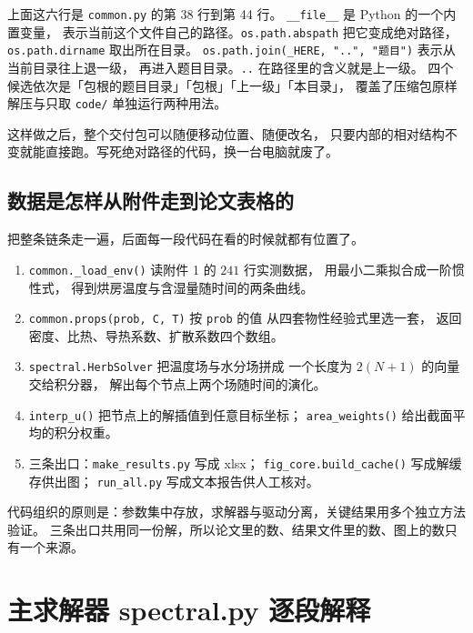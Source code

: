 上面这六行是 \texttt{common.py} 的第 38 行到第 44 行。
\texttt{\_\_file\_\_} 是 Python 的一个内置变量，
表示当前这个文件自己的路径。\texttt{os.path.abspath} 把它变成绝对路径，
\texttt{os.path.dirname} 取出所在目录。
\texttt{os.path.join(\_HERE, "..", "题目")} 表示从当前目录往上退一级，
再进入题目目录。\texttt{..} 在路径里的含义就是上一级。
四个候选依次是「包根的题目目录」「包根」「上一级」「本目录」，
覆盖了压缩包原样解压与只取 \texttt{code/} 单独运行两种用法。

这样做之后，整个交付包可以随便移动位置、随便改名，
只要内部的相对结构不变就能直接跑。写死绝对路径的代码，换一台电脑就废了。

\subsection{数据是怎样从附件走到论文表格的}

把整条链条走一遍，后面每一段代码在看的时候就都有位置了。

\begin{enumerate}[leftmargin=1.8em,itemsep=2pt]
\item \texttt{common.\_load\_env()} 读附件 1 的 $241$ 行实测数据，
  用最小二乘拟合成一阶惯性式，
  得到烘房温度与含湿量随时间的两条曲线。
\item \texttt{common.props(prob, C, T)} 按 \texttt{prob} 的值
  从四套物性经验式里选一套，
  返回密度、比热、导热系数、扩散系数四个数组。
\item \texttt{spectral.HerbSolver} 把温度场与水分场拼成
  一个长度为 $2(N+1)$ 的向量交给积分器，
  解出每个节点上两个场随时间的演化。
\item \texttt{interp\_u()} 把节点上的解插值到任意目标坐标；
  \texttt{area\_weights()} 给出截面平均的积分权重。
\item 三条出口：\texttt{make\_results.py} 写成 xlsx；
  \texttt{fig\_core.build\_cache()} 写成解缓存供出图；
  \texttt{run\_all.py} 写成文本报告供人工核对。
\end{enumerate}

\keypoint
代码组织的原则是：参数集中存放，求解器与驱动分离，关键结果用多个独立方法验证。
三条出口共用同一份解，所以论文里的数、结果文件里的数、图上的数只有一个来源。

\section{主求解器 spectral.py 逐段解释}

